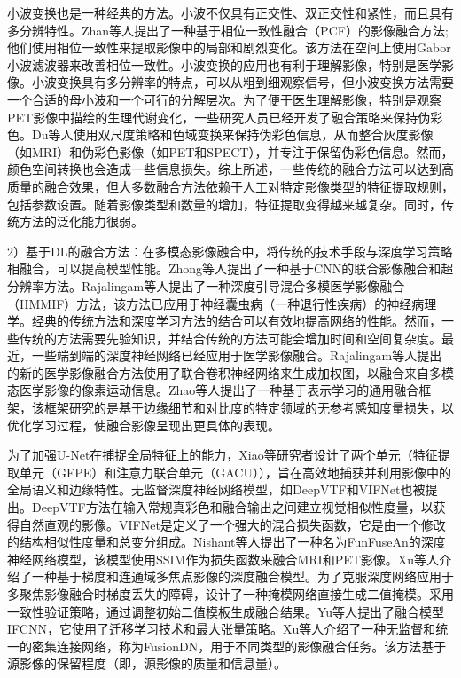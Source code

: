 小波变换也是一种经典的方法。小波不仅具有正交性、双正交性和紧性，而且具有多分辨特性。Zhan等人\cite{zhan2015multifocus}提出了一种基于相位一致性融合（PCF）的影像融合方法;他们使用相位一致性来提取影像中的局部和剧烈变化。该方法在空间上使用Gabor小波滤波器来改善相位一致性。小波变换的应用\cite{2018ImageWen,2019Waveatom}也有利于理解影像，特别是医学影像。小波变换具有多分辨率的特点，可以从粗到细观察信号，但小波变换方法需要一个合适的母小波和一个可行的分解层次。为了便于医生理解影像，特别是观察PET影像中描绘的生理代谢变化，一些研究人员已经开发了融合策略来保持伪彩色。Du等人\cite{2020An}使用双尺度策略和色域变换来保持伪彩色信息，从而整合灰度影像（如MRI）和伪彩色影像（如PET和SPECT），并专注于保留伪彩色信息。然而，颜色空间转换也会造成一些信息损失。综上所述，一些传统的融合方法可以达到高质量的融合效果，但大多数融合方法依赖于人工对特定影像类型的特征提取规则，包括参数设置。随着影像类型和数量的增加，特征提取变得越来越复杂。同时，传统方法的泛化能力很弱。

2）基于DL的融合方法：在多模态影像融合中，将传统的技术手段与深度学习策略相融合，可以提高模型性能。Zhong等人\cite{Zhong2016Image}提出了一种基于CNN的联合影像融合和超分辨率方法。Rajalingam等人\cite{2020Intelligent}提出了一种深度引导混合多模医学影像融合（HMMIF）方法，该方法已应用于神经囊虫病（一种退行性疾病）的神经病理学。经典的传统方法和深度学习方法的结合可以有效地提高网络的性能。然而，一些传统的方法需要先验知识，并结合传统的方法可能会增加时间和空间复杂度。最近，一些端到端的深度神经网络已经应用于医学影像融合\cite{2019MCFNet, 2020Identification}。Rajalingam等人\cite{2018Multimodal}提出的新的医学影像融合方法使用了联合卷积神经网络来生成加权图，以融合来自多模态医学影像的像素运动信息。Zhao等人\cite{xiao2020global}提出了一种基于表示学习的通用融合框架，该框架研究的是基于边缘细节和对比度的特定领域的无参考感知度量损失，以优化学习过程，使融合影像呈现出更具体的表现。

为了加强U-Net在捕捉全局特征上的能力，Xiao等研究者\cite{xiao2020global}设计了两个单元（特征提取单元（GFPE）和注意力联合单元（GACU）），旨在高效地捕获并利用影像中的全局语义和边缘特性。无监督深度神经网络模型，如DeepVTF\cite{2019Deep}和VIFNet\cite{2020VIF}也被提出。DeepVTF方法在输入常规真彩色和融合输出之间建立视觉相似性度量，以获得自然直观的影像。VIFNet是定义了一个强大的混合损失函数，它是由一个修改的结构相似性度量和总变分组成。Nishant等人\cite{kumar2019structural}提出了一种名为FunFuseAn的深度神经网络模型，该模型使用SSIM作为损失函数来融合MRI和PET影像。Xu等人\cite{Xu2020A}介绍了一种基于梯度和连通域多焦点影像的深度融合模型。为了克服深度网络应用于多聚焦影像融合时梯度丢失的障碍，设计了一种掩模网络直接生成二值掩模。采用一致性验证策略，通过调整初始二值模板生成融合结果。Yu等人\cite{2020IFCNN}提出了融合模型IFCNN，它使用了迁移学习技术和最大张量策略。Xu等人\cite{2020FusionDN}介绍了一种无监督和统一的密集连接网络，称为FusionDN，用于不同类型的影像融合任务。该方法基于源影像的保留程度（即，源影像的质量和信息量）。

